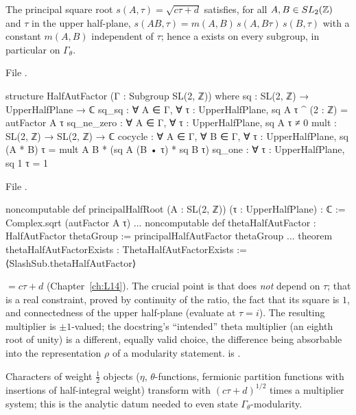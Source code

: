 \begin{theorem}\label{l17:thm:halfaut}
The principal square root $s(A,\tau)=\sqrt{c\tau+d}$ satisfies, for all $A,B\in SL_2({\mathbb{Z}})$ and $\tau$ in
the upper half-plane, $s(AB,\tau)=m(A,B)\,s(A,B\tau)\,s(B,\tau)$ with a constant $m(A,B)$ independent
of $\tau$; hence a  exists on every subgroup, in particular on $\Gamma_\theta$.
\end{theorem}
\noindent File .
\begin{leancode}
structure HalfAutFactor (Γ : Subgroup SL(2, ℤ)) where
  sq : SL(2, ℤ) → UpperHalfPlane → ℂ
  sq_sq : ∀ A ∈ Γ, ∀ τ : UpperHalfPlane, sq A τ ^ (2 : ℤ) = autFactor A τ
  sq_ne_zero : ∀ A ∈ Γ, ∀ τ : UpperHalfPlane, sq A τ ≠ 0
  mult : SL(2, ℤ) → SL(2, ℤ) → ℂ
  cocycle : ∀ A ∈ Γ, ∀ B ∈ Γ, ∀ τ : UpperHalfPlane,
    sq (A * B) τ = mult A B * (sq A (B • τ) * sq B τ)
  sq_one : ∀ τ : UpperHalfPlane, sq 1 τ = 1
\end{leancode}
\noindent File .
\begin{leancode}
noncomputable def principalHalfRoot (A : SL(2, ℤ)) (τ : UpperHalfPlane) : ℂ :=
  Complex.sqrt (autFactor A τ)
...
noncomputable def thetaHalfAutFactor : HalfAutFactor thetaGroup :=
  principalHalfAutFactor thetaGroup
...
theorem thetaHalfAutFactorExists : ThetaHalfAutFactorExists :=
  ⟨SlashSub.thetaHalfAutFactor⟩
\end{leancode}
\begin{dictionary}
 $=c\tau+d$ (Chapter~\ref{ch:L14}). The crucial point is that  does
\emph{not} depend on $\tau$; that is a real constraint, proved by continuity of the ratio, the fact that
its square is $1$, and connectedness of the upper half-plane (evaluate at $\tau=i$). The resulting
multiplier is $\pm1$-valued; the docstring's ``intended'' theta multiplier (an eighth root of unity) is
a different, equally valid choice, the difference being absorbable into the representation $\rho$ of a
modularity statement.  is
.
\end{dictionary}
\begin{physics}
Characters of weight $\frac12$ objects ($\eta$, $\theta$-functions, fermionic partition functions with
insertions of half-integral weight) transform with $(c\tau+d)^{1/2}$ times a multiplier system; this is
the analytic datum needed to even state $\Gamma_\theta$-modularity.
\end{physics}
